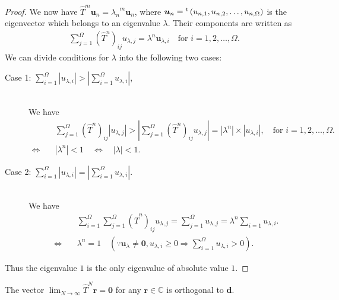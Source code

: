 \begin{proof}
	We now have $\hat{T}^{m}\bm{u}_{n}={\lambda_{n}}^{m}\bm{u}_{n}$, where $\bm{u}_{n} = {}^{\rm t}\left(u_{n,1}, u_{n,2}, \dots, u_{n,\Omega}\right)$ is the eigenvector which belongs to an eigenvalue $\lambda$. Their components are written as
	\begin{align}
	\sum_{j=1}^{\Omega}\left(\hat{T}^{n}\right)_{ij}u_{\lambda,j} = \lambda^{n} \bm{u}_{\lambda,i}\quad\text{for $i = 1,2,\dots,\Omega$}.
	\end{align}
	We can divide conditions for $\lambda$ into the following two cases:
	\begin{description}
		\item[Case 1: $\sum_{i=1}^{\Omega}|u_{\lambda,i}| > |\sum_{i=1}^{\Omega}u_{\lambda,i}|$,]\mbox{}\\
		We have
		\begin{align}
		&\sum_{j=1}^{\Omega}\left(\hat{T}^{n}\right)_{ij}|u_{\lambda,j}| > |\sum_{j=1}^{\Omega}\left(\hat{T}^{n}\right)_{ij}u_{\lambda,j}| = |\lambda^{n}|\times|u_{\lambda,i}|,\quad\text{for $i = 1,2,\dots,\Omega$}.\\
		\Longleftrightarrow\quad & |\lambda^{n}| < 1 \quad \Longleftrightarrow\quad |\lambda| < 1.
		\end{align}
		\item[Case 2: $\sum_{i=1}^{\Omega}|u_{\lambda,i}| = |\sum_{i=1}^{\Omega}u_{\lambda,i}|$.]\mbox{}\\
		We have
		\begin{align}
		& \sum_{i=1}^{\Omega}\sum_{j=1}^{\Omega}\left(\hat{T}^{n}\right)_{ij}u_{\lambda,j}  = \sum_{j=1}^{\Omega}u_{\lambda,j}  = \lambda^{n}\sum_{i=1}u_{\lambda,i}.\\
		\Longleftrightarrow\quad & \lambda^{n} = 1\quad\left(\because \bm{u}_{\lambda}\neq\bm{0},u_{\lambda,i}\geq 0 \Rightarrow \sum_{i=1}^{\Omega}u_{\lambda,i} > 0\right).
		\end{align}
	\end{description}
	Thus the eigenvalue $1$ is the only eigenvalue of absolute value $1$.
\end{proof}

\begin{lemma}
	The vector $\lim_{N\to\infty}\hat{T}^{N}\bm{r} = \bm{0}$ for any $\bm{r}\in\mathbb{C}$ is orthogonal to $\bm{d}$.
\end{lemma}

